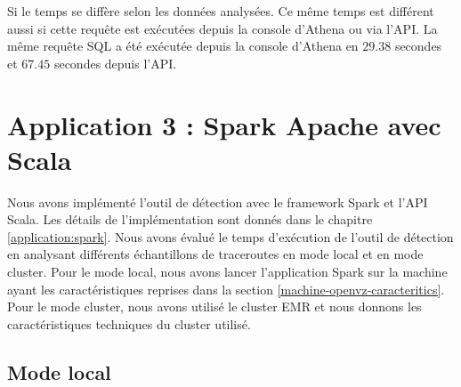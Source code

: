 \begin{table}[h]
	\captionsetup{justification=centering}
	\centering
\caption{Les temps d'exécution d'une requête SQL sur Amazon Athena selon les données analysées}
\label{datatimeathenaconsole}
\end{table}

Si le temps se diffère selon les données analysées. Ce même temps est différent aussi si cette requête est exécutées depuis la console d'Athena ou via l'API. La même requête SQL a été exécutée depuis la console d'Athena  en $ 29.38 $ secondes et $ 67.45 $ secondes depuis l'API.






\section{Application 3 : Spark Apache avec Scala}
Nous avons implémenté l'outil de détection avec le framework Spark et l'API Scala. Les détails de l'implémentation sont donnés dans le chapitre \ref{application:spark}.  Nous avons évalué le temps d'exécution de l'outil de détection en analysant différents échantillons de traceroutes  en mode local et en mode cluster. Pour le mode local, nous avons lancer l'application Spark sur la machine ayant les caractéristiques  reprises dans la section \ref{machine-openvz-caracteritics}. Pour le mode cluster, nous avons utilisé le cluster EMR et nous donnons les caractéristiques techniques du cluster utilisé.


\subsection{Mode local}

